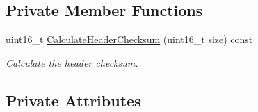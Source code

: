\subsection*{Private Member Functions}
\begin{DoxyCompactItemize}
\item 
uint16\+\_\+t \hyperlink{classns3_1_1UdpHeader_a09592aff1c50e1537846558505e27f41}{Calculate\+Header\+Checksum} (uint16\+\_\+t size) const 
\begin{DoxyCompactList}\small\item\em Calculate the header checksum. \end{DoxyCompactList}\end{DoxyCompactItemize}
\subsection*{Private Attributes}
